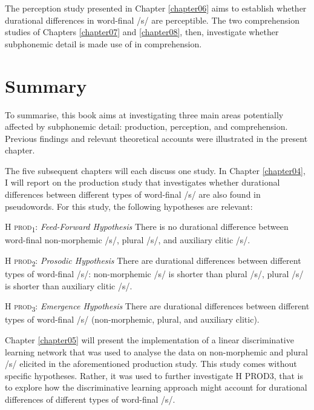 The perception study presented in Chapter \ref{chapter06} aims to establish whether durational differences in word-final /s/ are perceptible. The two comprehension studies of Chapters \ref{chapter07} and \ref{chapter08}, then, investigate whether subphonemic detail is made use of in comprehension.

\section{Summary}\label{section02_3}

To summarise, this book aims at investigating three main areas potentially affected by subphonemic detail: production, perception, and comprehension. Previous findings and relevant theoretical accounts were illustrated in the present chapter. 

The five subsequent chapters will each discuss one study. In Chapter \ref{chapter04}, I will report on the production study that investigates whether durational differences between different types of word-final /s/ are also found in pseudowords. For this study, the following hypotheses are relevant:

\begin{description}
\item\textsc{H prod\textsubscript{1}}: \textit{Feed-Forward Hypothesis} \newline
There is no durational difference between word-final non-morphemic /s/, plural /s/, and auxiliary clitic /s/.

\item\textsc{H prod\textsubscript{2}}: \textit{Prosodic Hypothesis} \newline
There are durational differences between different types of word-final /s/: 
non-morphemic /s/ is shorter than plural /s/, plural /s/ is shorter than auxiliary clitic /s/.

\item\textsc{H prod\textsubscript{3}}: \textit{Emergence Hypothesis} \newline
There are durational differences between different types of word-final /s/ (non-morphemic, plural, and auxiliary clitic).
\end{description}

Chapter \ref{chapter05} will present the implementation of a linear discriminative learning network that was used to analyse the data on non-morphemic and plural /s/ elicited in the aforementioned production study. This study comes without specific hypotheses. Rather, it was used to further investigate H PROD3, that is to explore how the discriminative learning approach might account for durational differences of different types of word-final /s/.

